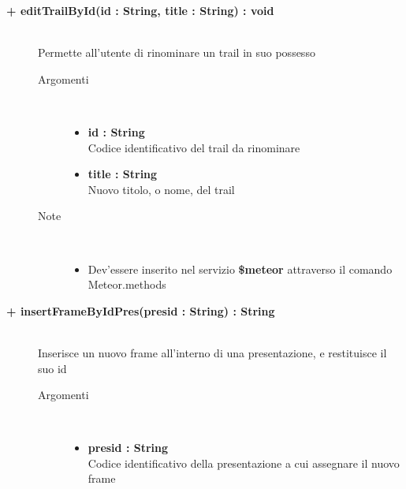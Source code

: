 \begin{description}
	\begin{description}
		\item[\textbf{\color{blue}+ editTrailById(id : String, title : String) : void			}] \hfill \\
			Permette all'utente di rinominare un trail in suo possesso
			
		\begin{description}
			\item[Argomenti] \hfill \\
				\begin{itemize}
				
					\item \textbf{id : String		} \hfill \\
					Codice identificativo del trail da rinominare
					\item \textbf{title : String		} \hfill \\
					Nuovo titolo, o nome, del trail
					
				\end{itemize}
			\item[Note] \hfill \\
			\begin{itemize}
					\item Dev'essere inserito nel servizio \textbf{\$meteor} attraverso il comando Meteor.methods
				\end{itemize}
		\end{description}
	\end{description}
	
	\begin{description}
		\item[\textbf{\color{blue}+ insertFrameByIdPres(presid : String) : String			}] \hfill \\
			Inserisce un nuovo frame all'interno di una presentazione, e restituisce il suo id
			
		\begin{description}
			\item[Argomenti] \hfill \\
				\begin{itemize}
				
					\item \textbf{presid : String			} \hfill \\
					Codice identificativo della presentazione a cui assegnare il nuovo frame
					

\end{itemize}
\end{description}
\end{description}
\end{description}
